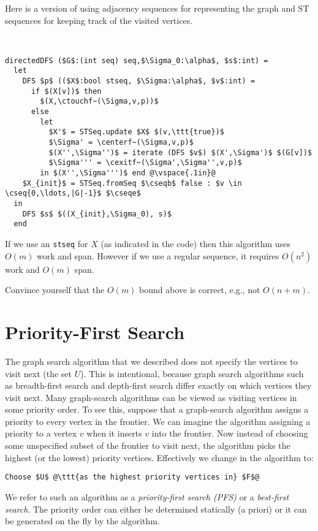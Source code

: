 Here is a version of \dfs{} using adjacency sequences for representing the
graph and ST sequences for keeping track of the visited vertices.

\begin{algorithm}
~\\
\begin{lstlisting}
directedDFS ($G$:(int seq) seq,$\Sigma_0:\alpha$, $s$:int) =
  let
    DFS $p$ (($X$:bool stseq, $\Sigma:\alpha$, $v$:int) =
      if $(X[v])$ then 
        $(X,\ctouchf~(\Sigma,v,p))$
      else 
        let
          $X'$ = STSeq.update $X$ $(v,\ttt{true})$
          $\Sigma' = \centerf~(\Sigma,v,p)$
          $(X'',\Sigma'')$ = iterate (DFS $v$) $(X',\Sigma')$ $(G[v])$
          $\Sigma''' = \cexitf~(\Sigma',\Sigma'',v,p)$
        in $(X'',\Sigma''')$ end @\vspace{.1in}@
    $X_{init}$ = STSeq.fromSeq $\cseqb$ false : $v \in \cseq{0,\ldots,|G|-1}$ $\cseqe$
  in
    DFS $s$ $((X_{init},\Sigma_0), s)$
  end
\end{lstlisting}
\end{algorithm}

If we use an \texttt{stseq} for $X$ (as indicated in the code) then
this algorithm uses $O(m)$ work and span.
%
However if we use a regular sequence, it requires $O(n^2)$ work and
$O(m)$ span.

\begin{exercise}
Convince yourself that the $O(m)$ bound above is correct, e.g., 
not $O(n+m)$.
\end{exercise}

\section{Priority-First Search}

The graph search algorithm that we described does not specify the
vertices to visit next (the set $U$). This is intentional, because
graph search algorithms such as breadth-first search and depth-first
search differ exactly on which vertices they visit next.  
%
Many graph-search algorithms can be viewed as visiting vertices in
some priority order.  To see this, suppose that a graph-search
algorithm assigns a priority to every vertex in the frontier.
%
We can imagine the algorithm assigning a priority to a vertex $v$ when
it inserts $v$ into the frontier. 
%
Now instead of choosing some unspecified subset of the frontier to
visit next, the algorithm picks the highest (or the lowest) priority
vertices.  Effectively we change  in the
 algorithm to:
\begin{lstlisting}[numbers=none]
      Choose $U$ @\ttt{as the highest priority vertices in} $F$@
\end{lstlisting}
We refer to such an algorithm as a \emph{priority-first search (PFS)}
or a {\em best-first search}.  The priority order can either be
determined statically (a priori) or it can be generated on the fly by
the algorithm.


